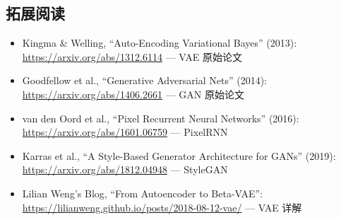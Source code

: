 \subsection{拓展阅读}

\begin{itemize}
    \item Kingma \& Welling, ``Auto-Encoding Variational Bayes'' (2013): \url{https://arxiv.org/abs/1312.6114} --- VAE 原始论文
    \item Goodfellow et al., ``Generative Adversarial Nets'' (2014): \url{https://arxiv.org/abs/1406.2661} --- GAN 原始论文
    \item van den Oord et al., ``Pixel Recurrent Neural Networks'' (2016): \url{https://arxiv.org/abs/1601.06759} --- PixelRNN
    \item Karras et al., ``A Style-Based Generator Architecture for GANs'' (2019): \url{https://arxiv.org/abs/1812.04948} --- StyleGAN
    \item Lilian Weng's Blog, ``From Autoencoder to Beta-VAE'': \url{https://lilianweng.github.io/posts/2018-08-12-vae/} --- VAE 详解
\end{itemize}


